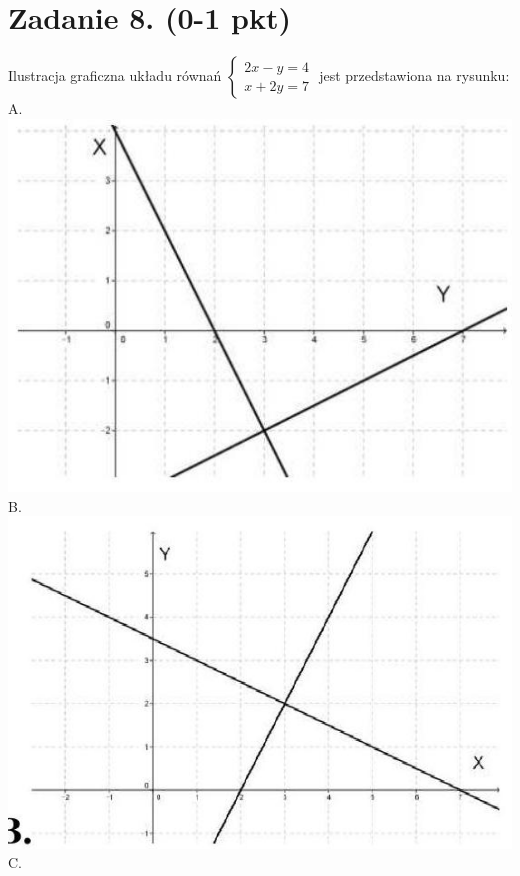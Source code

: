 \documentclass[10pt]{article}
\begin{document}
\section*{Zadanie 8. (0-1 pkt)}
Ilustracja graficzna układu równań \(\left\{\begin{array}{l}2 x-y=4 \\ x+2 y=7\end{array}\right.\) jest przedstawiona na rysunku:\\
A.\\
\includegraphics[max width=\textwidth, center]{2024_11_21_b8ac5f500a5bbb1b4ec5g-04(2)}\\
B.\\
\includegraphics[max width=\textwidth, center]{2024_11_21_b8ac5f500a5bbb1b4ec5g-04(1)}\\
C.\\
\end{document}
